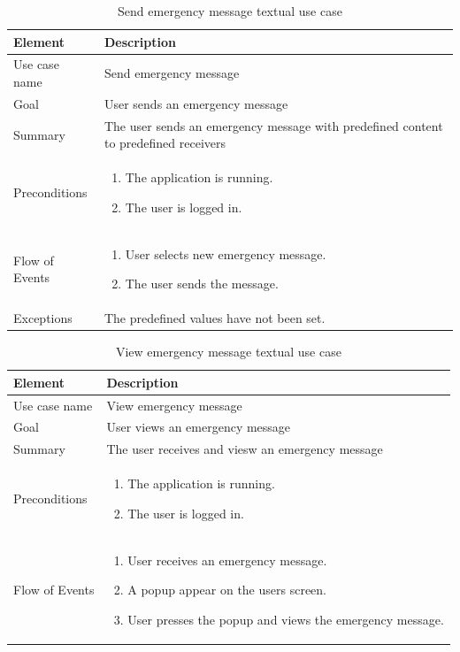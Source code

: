 \begin{table}
\begin{tabular}{p{3cm}p{12cm}}

Element & Description \\ \hline
Use case name & Send emergency message \\
Goal & User sends an emergency message \\
Summary & The user sends an emergency message with predefined content to predefined receivers \\
Preconditions &
\begin{enumerate}
\item{}The application is running.
\item{}The user is logged in.
\end{enumerate} \\ \hline
Flow of Events &
\begin{enumerate}
\item{}User selects new emergency message.
\item{}The user sends the message.
\end{enumerate} \\ \hline
Exceptions & The predefined values have not been set.
\end{tabular}
\caption{Send emergency message textual use case} \label{tab:createmessage}
\end{table}




\begin{table}
\begin{tabular}{p{3cm}p{12cm}}

Element & Description \\ \hline
Use case name & View emergency message \\
Goal & User views an emergency message \\
Summary & The user receives and viesw an emergency message \\
Preconditions &
\begin{enumerate}
\item{}The application is running.
\item{}The user is logged in.
\end{enumerate} \\ \hline
Flow of Events &
\begin{enumerate}
\item{}User receives an emergency message.
\item{}A popup appear on the users screen.
\item{}User presses the popup and views the emergency message.
\end{enumerate} \\ \hline
\end{tabular}
\caption{View emergency message textual use case} \label{tab:createmessage}
\end{table}

